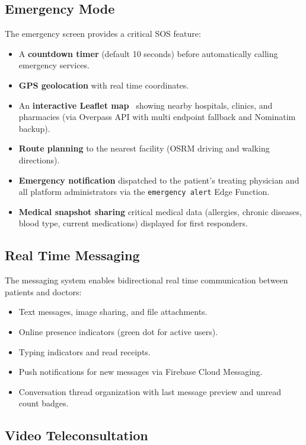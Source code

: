 \documentclass[12pt,a4paper,oneside]{report}
\begin{document}
\subsection{Emergency Mode}

The emergency screen provides a critical SOS feature:

\begin{itemize}
    \item A \textbf{countdown timer} (default 10 seconds) before automatically calling emergency services.
    \item \textbf{GPS geolocation} with real time coordinates.
    \item An \textbf{interactive Leaflet map}~\cite{leaflet} showing nearby hospitals, clinics, and pharmacies (via Overpass API with multi endpoint fallback and Nominatim backup).
    \item \textbf{Route planning} to the nearest facility (OSRM driving and walking directions).
    \item \textbf{Emergency notification} dispatched to the patient's treating physician and all platform administrators via the \texttt{emergency alert} Edge Function.
    \item \textbf{Medical snapshot sharing} critical medical data (allergies, chronic diseases, blood type, current medications) displayed for first responders.
\end{itemize}

\subsection{Real Time Messaging}

The messaging system enables bidirectional real time communication between patients and doctors:

\begin{itemize}
    \item Text messages, image sharing, and file attachments.
    \item Online presence indicators (green dot for active users).
    \item Typing indicators and read receipts.
    \item Push notifications for new messages via Firebase Cloud Messaging.
    \item Conversation thread organization with last message preview and unread count badges.
\end{itemize}

\subsection{Video Teleconsultation}
\end{document}
